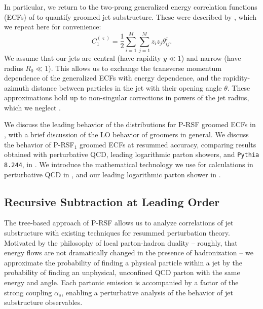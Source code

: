 \documentclass[letterpaper,11pt]{article}
\begin{document}
In particular, we return to the two-prong generalized energy correlation functions (ECFs) of  to quantify groomed jet substructure.
%
These were described by , which we repeat here for convenience:
\begin{equation}
    C_1^{(\varsigma)} = \frac{1}{2}\sum_{i=1}^M\sum_{j=1}^M z_i z_j \theta_{ij}^\varsigma
    \label{eqn:ECFdefn_repeat}
    .
\end{equation}
We assume that our jets are central (have rapidity \(y \ll 1\)) and narrow (have radius \(R_0 \ll 1\)).
%
This allows us to exchange the transverse momentum dependence of the generalized ECFs with energy dependence, and the rapidity-azimuth distance between particles in the jet with their opening angle \(\theta\).
%
These approximations hold up to non-singular corrections in powers of the jet radius, which we neglect \cite{Larkoski:2014wba}.

We discuss the leading behavior of the distributions for P-RSF groomed ECFs in , with a brief discussion of the LO behavior of \PIRANHA{} groomers in general.
%
We discuss the behavior of P-RSF\(_{1}\) groomed ECFs at resummed accuracy, comparing results obtained with perturbative QCD, leading logarithmic parton showers, and \texttt{Pythia 8.244}, in .
%
We introduce the mathematical technology we use for calculations in perturbative QCD in , and our leading logarithmic parton shower in .

\subsection{Recursive Subtraction at Leading Order}
\label{app:LO_RSF}

The tree-based approach of P-RSF allows us to analyze correlations of jet substructure with existing techniques for resummed perturbation theory.
%
Motivated by the philosophy of local parton-hadron duality \cite{Azimov:1984np,Andersson:1989ww,Shifman:2003de,Neill:2020tzl} -- roughly, that energy flows are not dramatically changed in the presence of hadronization -- we approximate the probability of finding a physical particle within a jet by the probability of finding an unphysical, unconfined QCD parton with the same energy and angle.
%
Each partonic emission is accompanied by a factor of the strong coupling \(\alpha_s\), enabling a perturbative analysis of the behavior of jet substructure observables.
\end{document}
